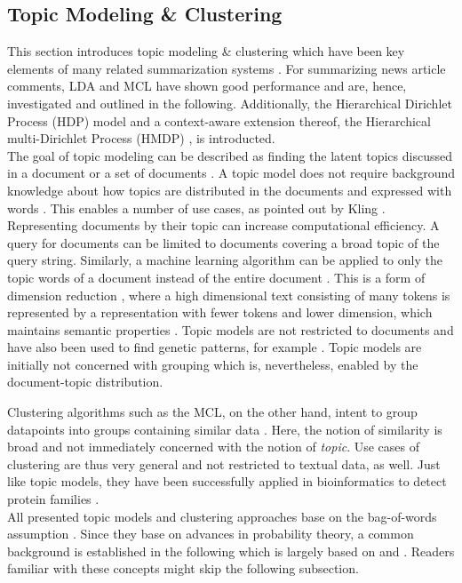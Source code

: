 \subsection{Topic Modeling \& Clustering}
\label{TM}
This section introduces topic modeling \& clustering which have been key elements of many related summarization systems \cite{DBLP:journals/corr/cs-CL-0005020, DBLP:conf/cikm/MaSYC12, llewellyn_grover_oberlander, DBLP:conf/icwsm/KhabiriCH11, Arora:2008:LDA:1390749.1390764, DBLP:conf/lrec/BarkerPFKAFHG16, Wan:2008:MSU:1390334.1390386, llewellyn_grover_oberlander}. For summarizing news article comments, LDA \cite{DBLP:conf/cikm/MaSYC12, llewellyn_grover_oberlander} and MCL \cite{DBLP:conf/lrec/BarkerPFKAFHG16} have shown good performance and are, hence, investigated and outlined in the following. Additionally, the Hierarchical Dirichlet Process (HDP) \cite{Teh04hierarchicaldirichlet} model and a context-aware extension thereof, the Hierarchical multi-Dirichlet Process (HMDP) \cite{DBLP:phd/dnb/Kling16}, is introducted. \\
The goal of topic modeling can be described as finding the latent topics discussed in a document or a set of documents \cite{DBLP:phd/dnb/Kling16}. A topic model does not require background knowledge about how topics are distributed in the documents and expressed with words \cite{DBLP:phd/dnb/Kling16}. This enables a number of use cases, as pointed out by Kling \cite{DBLP:phd/dnb/Kling16}. Representing documents by their topic can increase computational efficiency. A query for documents can be limited to documents covering a broad topic of the query string. Similarly, a machine learning algorithm can be applied to only the topic words of a document instead of the entire document \cite{DBLP:phd/dnb/Kling16}. This is a form of dimension reduction \cite{Crain2012}, where a high dimensional text consisting of many tokens is represented by a representation with fewer tokens and lower dimension, which maintains semantic properties \cite{Crain2012}.
Topic models are not restricted to documents and have also been used to find genetic patterns, for example \cite{Blei:2012:PTM:2133806.2133826}. Topic models are initially not concerned with grouping which is, nevertheless, enabled by the document-topic distribution. \par
Clustering algorithms such as the MCL, on the other hand, intent to group datapoints into groups containing similar data \cite{Bishop:2006:PRM:1162264}. Here, the notion of similarity is broad and not immediately concerned with the notion of \textit{topic}. Use cases of clustering are thus very general and not restricted to textual data, as well. Just like topic models, they have been successfully applied in bioinformatics to detect protein families \cite{vandongen02}. \\
All presented topic models and clustering approaches base on the bag-of-words assumption \cite{DBLP:phd/dnb/Kling16}. Since they base on advances in probability theory, a common background is established in the following which is largely based on \cite{rockenfeller} and \cite{DBLP:phd/dnb/Kling16}. Readers familiar with these concepts might skip the following subsection.
